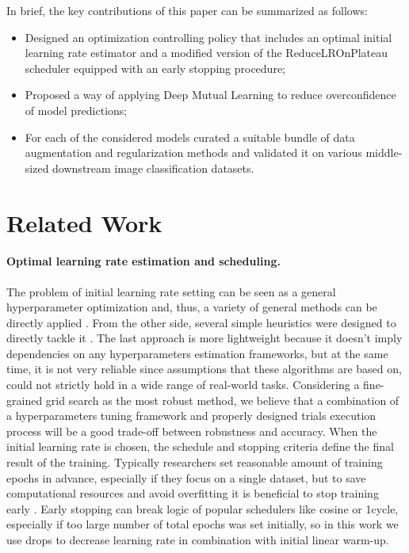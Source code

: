 \documentclass[runningheads]{llncs}
\begin{document}
In brief, the key contributions of this paper can be summarized as follows:
\begin{itemize}
  \item Designed an optimization controlling policy that includes an optimal initial learning rate estimator and
  a modified version of the ReduceLROnPlateau \cite{reduceonplateau} scheduler equipped with an early stopping procedure;
  \item Proposed a way of applying Deep Mutual Learning \cite{Zhang2018DeepML} to reduce overconfidence of model predictions;
  \item For each of the considered models curated a suitable bundle of data augmentation
  and regularization methods and validated it on various middle-sized downstream image classification datasets.
\end{itemize}


\section{Related Work}
\paragraph{Optimal learning rate estimation and scheduling.} The problem of
initial learning rate setting can be seen as a general hyperparameter optimization and, thus,
a variety of general methods can be directly applied \cite{optuna_2019, liaw2018tune}.
From the other side, several simple heuristics were designed to directly tackle it \cite{Mukherjee2019ASD, fastai_lr}.
The last approach is more lightweight because it doesn't imply dependencies on any hyperparameters estimation frameworks,
but at the same time, it is not very reliable since assumptions that these algorithms are based on, could
not strictly hold in a wide range of real-world tasks. Considering a fine-grained grid search as the most robust method,
we believe that a combination of a hyperparameters tuning framework and properly designed trials execution process
will be a good trade-off between robustness and accuracy. When the initial learning rate is chosen, the schedule and
stopping criteria define the final result of the training.
Typically researchers set reasonable amount of training epochs in advance, especially if they
focus on a single dataset, but to save computational resources and avoid overfitting it is beneficial to
stop training early \cite{early_stop, Zhang2017UnderstandingDL}. Early stopping can break logic of popular
schedulers like cosine or 1cycle\cite{Smith2019SuperconvergenceVF},
especially if too large number of total epochs was set initially, so
in this work we use drops to decrease learning rate in combination with initial linear warm-up.
\end{document}
